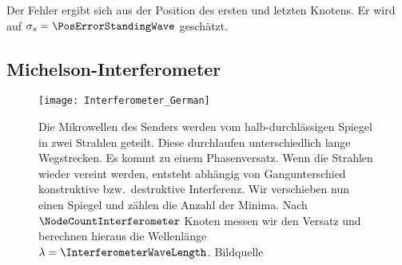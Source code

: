 \documentclass[a4paper,10pt,twocolumn]{article}
\begin{document}
    Der Fehler ergibt sich aus der Position des ersten und letzten Knotens.
    Er wird auf $\sigma_s = \PosErrorStandingWave$ geschätzt.
    
    \subsection{Michelson-Interferometer}

    \begin{figure}[htbp]
        \texttt{[image: Interferometer\_German]}
        \center
        \caption{
        Die Mikrowellen des Senders werden vom halb-durchlässigen Spiegel in zwei Strahlen geteilt.
        Diese durchlaufen unterschiedlich lange Wegstrecken.
        Es kommt zu einem Phasenversatz.
        Wenn die Strahlen wieder vereint werden, entsteht abhängig von Gangunterschied konstruktive
        bzw.\ destruktive Interferenz.
        Wir verschieben nun einen Spiegel und zählen die Anzahl der Minima.
        Nach $\NodeCountInterferometer$ Knoten messen wir den Versatz und berechnen hieraus die Wellenlänge
        $\lambda = \InterferometerWaveLength$.
        Bildquelle~\cite{imageMichelsonInterferometerWiki}
        }
        \label{fig:Interferometer}
    \end{figure}
    
    
\end{document}

